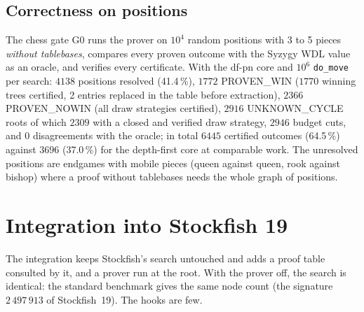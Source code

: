 \documentclass{article}
\theoremstyle{plain}
\theoremstyle{definition}
\theoremstyle{remark}
\newcommand{\PW}{\textsf{PROVEN\_WIN}}
\newcommand{\PN}{\textsf{PROVEN\_NOWIN}}
\newcommand{\UC}{\textsf{UNKNOWN\_CYCLE}}
\newcommand{\code}[1]{\texttt{#1}}
\begin{document}
\subsection{Correctness on positions}\label{sec:g0}

The chess gate G0 runs the prover on $10^4$ random positions with 3 to 5 pieces \emph{without tablebases}, compares every proven outcome with the Syzygy WDL value as an oracle, and verifies every certificate. With the df-pn core and $10^6$ \code{do\_move} per search: $4138$ positions resolved (41.4\,\%), $1772$ \PW{} ($1770$ winning trees certified, 2 entries replaced in the table before extraction), $2366$ \PN{} (all draw strategies certified), $2916$ \UC{} roots of which $2309$ with a closed and verified draw strategy, $2946$ budget cuts, and $0$ disagreements with the oracle; in total $6445$ certified outcomes (64.5\,\%) against $3696$ (37.0\,\%) for the depth-first core at comparable work. The unresolved positions are endgames with mobile pieces (queen against queen, rook against bishop) where a proof without tablebases needs the whole graph of positions.

\section{Integration into Stockfish 19}\label{sec:integration}

The integration keeps Stockfish's search untouched and adds a proof table consulted by it, and a prover run at the root. With the prover off, the search is identical: the standard benchmark gives the same node count (the signature $2\,497\,913$ of Stockfish~19). The hooks are few.
\end{document}
